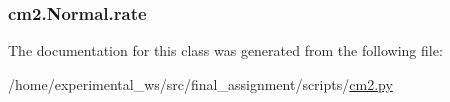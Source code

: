 \subsubsection[{\texorpdfstring{rate}{rate}}]{\setlength{\rightskip}{0pt plus 5cm}cm2.\+Normal.\+rate\hspace{0.3cm}{\ttfamily [static]}}\hypertarget{classcm2_1_1Normal_a9a5e8cb0a56188898c1641699018750f}{}\label{classcm2_1_1Normal_a9a5e8cb0a56188898c1641699018750f}


The documentation for this class was generated from the following file\+:\begin{DoxyCompactItemize}
\item 
/home/experimental\+\_\+ws/src/final\+\_\+assignment/scripts/\hyperlink{cm2_8py}{cm2.\+py}\end{DoxyCompactItemize}
